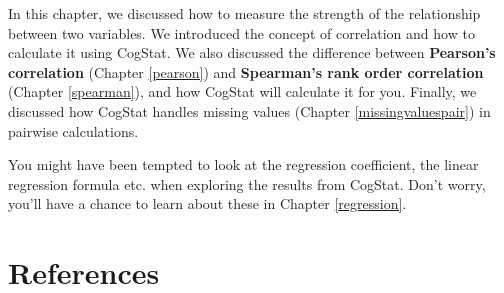 \documentclass[
  11pt,
  a4paper,
  twoside,symmetric,openright]{book}
\theoremstyle{break}
\theoremstyle{break}
\begin{document}
In this chapter, we discussed how to measure the strength of the relationship between two variables. We introduced the concept of correlation and how to calculate it using CogStat. We also discussed the difference between \textbf{Pearson's correlation} (Chapter \ref{pearson}) and \textbf{Spearman's rank order correlation} (Chapter \ref{spearman}), and how CogStat will calculate it for you. Finally, we discussed how CogStat handles missing values (Chapter \ref{missingvaluespair}) in pairwise calculations.

You might have been tempted to look at the regression coefficient, the linear regression formula etc. when exploring the results from CogStat. Don't worry, you'll have a chance to learn about these in Chapter \ref{regression}.

\hypertarget{references}{%
\chapter*{References}\label{references}}
\end{document}
